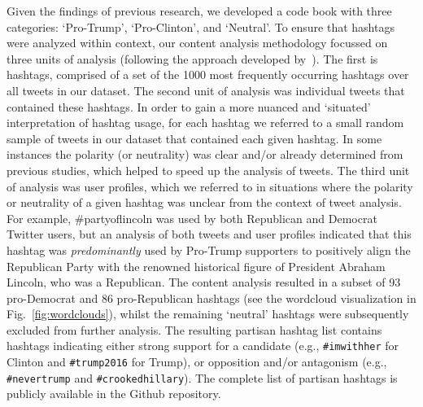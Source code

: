 Given the findings of previous research, we developed a code book with three categories: `Pro-Trump', `Pro-Clinton', and `Neutral'. 
To ensure that hashtags were analyzed within context, our content analysis methodology focussed on three units of analysis (following the approach developed by~\citet{small-2011}). 
The first is hashtags, comprised of a set of the 1000 most frequently occurring hashtags over all tweets in our dataset. 
The second unit of analysis was individual tweets that contained these hashtags. 
In order to gain a more nuanced and `situated' interpretation of hashtag usage, for each hashtag we referred to a small random sample of tweets in our dataset that contained each given hashtag. 
In some instances the polarity (or neutrality) was clear and/or already determined from previous studies, which helped to speed up the analysis of tweets. 
The third unit of analysis was user profiles, which we referred to in situations where the polarity or neutrality of a given hashtag was unclear from the context of tweet analysis. 
For example, \#partyoflincoln was used by both Republican and Democrat Twitter users, but an analysis of both tweets and user profiles indicated that this hashtag was \textit{predominantly} used by Pro-Trump supporters to positively align the Republican Party with the renowned historical figure of President Abraham Lincoln, who was a Republican. 
The content analysis resulted in a subset of 93 pro-Democrat and 86 pro-Republican hashtags (see the wordcloud visualization in Fig.~\ref{fig:wordclouds}), whilst the remaining `neutral' hashtags were subsequently excluded from further analysis.
The resulting partisan hashtag list contains hashtags indicating either strong support for a candidate (e.g., \texttt{\#imwithher} for Clinton and \texttt{\#trump2016} for Trump), or opposition and/or antagonism (e.g., \texttt{\#nevertrump} and \texttt{\#crookedhillary}).
The complete list of partisan hashtags is publicly available in the Github repository.

